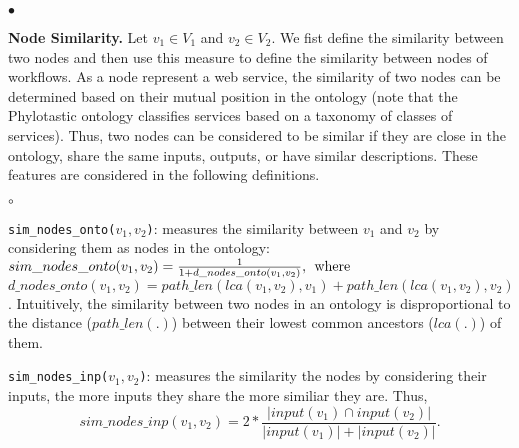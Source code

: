 \documentclass{new_tlp}
\begin{document}
{\begin{list}{$\bullet$}{\itemsep=0pt \parsep=1pt \topsep=1pt \leftmargin=10pt}
\item 
{\bf Node Similarity.} Let $v_{1} \in V_1$ and $v_{2} \in V_2$.  We fist define
the similarity between two nodes and then use this measure to define the similarity between nodes of workflows. 
As a node represent a web service, the similarity of two nodes can be determined based on their mutual 
position in the ontology (note that the Phylotastic ontology classifies services based on a taxonomy of 
classes of services). Thus, two nodes can be considered to be  similar if they are close in the ontology, share the same 
inputs, outputs, or have similar descriptions. These features are considered in the following definitions. 
%
%
\begin{list}{$\circ$}{\itemsep=0pt \topsep=0pt \parsep=0pt \leftmargin=6pt}
	\item \texttt{sim\_nodes\_onto($v_{1},v_{2}$)}: measures the similarity between $v_{1}$ and $v_{2}$ by considering them as nodes in the ontology: \\%
			$sim\_nodes\_onto(v_{1},v_{2}) = \frac{1}{1 + d\_nodes\_onto(v_{1},v_{2})}, \:\: \textnormal{where}$\\
		   $d\_nodes\_onto(v_{1},v_{2}) = path\_len(lca(v_{1},v_{2}),v_{1}) + path\_len(lca(v_{1},v_{2}),v_{2})$.
		   Intuitively, the similarity between two nodes in an ontology 
		   is disproportional to the distance ($path\_len(.)$) between their lowest common ancestors ($lca(.)$) of 
		   them. 
		   
		   
	
	\item \texttt{sim\_nodes\_inp($v_{1},v_{2}$)}: measures the similarity the nodes by considering their inputs, the more inputs they share the more similiar they are. Thus, \\
			$$sim\_nodes\_inp(v_{1},v_{2}) = 2*\frac{| input(v_{1}) \cap input(v_{2}) |}{| input(v_{1}) | + | input(v_{2}) |}.$$ 
	

\end{list}
\end{list}}
\end{document}
